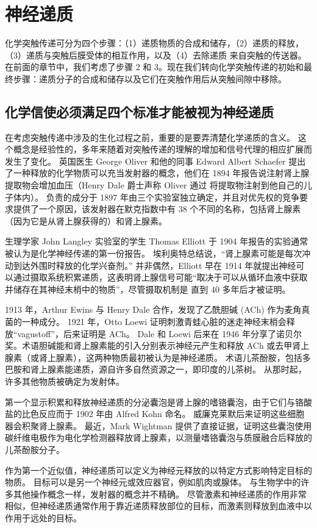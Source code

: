 \chapter{神经递质}
化学突触传递可分为四个步骤：（1）递质物质的合成和储存，（2）递质的释放，（3）递质与突触后膜受体的相互作用，以及（4）去除递质 来自突触的传送器。 在前面的章节中，我们考虑了步骤 2 和 3。现在我们转向化学突触传递的初始和最终步骤：递质分子的合成和储存以及它们在突触作用后从突触间隙中移除。

\section{化学信使必须满足四个标准才能被视为神经递质}
在考虑突触传递中涉及的生化过程之前，重要的是要弄清楚化学递质的含义。 这个概念是经验性的，多年来随着对突触传递的理解的增加和信号代理的相应扩展而发生了变化。 英国医生 George Oliver 和他的同事 Edward Albert Schaefer 提出了一种释放的化学物质可以充当发射器的概念，他们在 1894 年报告说注射肾上腺提取物会增加血压（Henry Dale 爵士声称 Oliver 通过 将提取物注射到他自己的儿子体内）。 负责的成分于 1897 年由三个实验室独立确定，并且对优先权的竞争要求提供了一个原因，该发射器在默克指数中有 38 个不同的名称，包括肾上腺素（因为它是从肾上腺获得的）和肾上腺素。

生理学家 John Langley 实验室的学生 Thomas Elliott 于 1904 年报告的实验通常被认为是化学神经传递的第一份报告。 埃利奥特总结说，“肾上腺素可能是每次冲动到达外围时释放的化学兴奋剂。” 并非偶然，Elliott 早在 1914 年就提出神经可以通过摄取系统积累递质，这表明肾上腺信号可能“取决于可以从循环血液中获取并储存在其神经末梢中的物质”，尽管摄取机制是 直到 40 多年后才被证明。

1913 年，Arthur Ewins 与 Henry Dale 合作，发现了乙酰胆碱 (ACh) 作为麦角真菌的一种成分。 1921 年，Otto Loewi 证明刺激青蛙心脏的迷走神经末梢会释放“vagustoff”，后来证明是 ACh。 Dale 和 Loewi 后来在 1946 年分享了诺贝尔奖。术语胆碱能和肾上腺素能的引入分别表示神经元产生和释放 ACh 或去甲肾上腺素（或肾上腺素），这两种物质最初被认为是神经递质。 术语儿茶酚胺，包括多巴胺和肾上腺素能递质，源自许多自然资源之一，即印度的儿茶树。 从那时起，许多其他物质被确定为发射体。

第一个显示积累和释放神经递质的分泌囊泡是肾上腺的嗜铬囊泡，由于它们与铬酸盐的比色反应而于 1902 年由 Alfred Kohn 命名。 威廉克莱默后来证明这些细胞器会积聚肾上腺素。 最近，Mark Wightman 提供了直接证据，证明这些囊泡使用碳纤维电极作为电化学检测器释放肾上腺素，以测量嗜铬囊泡与质膜融合后释放的儿茶酚胺分子。

作为第一个近似值，神经递质可以定义为神经元释放的以特定方式影响特定目标的物质。 目标可以是另一个神经元或效应器官，例如肌肉或腺体。 与生物学中的许多其他操作概念一样，发射器的概念并不精确。 尽管激素和神经递质的作用非常相似，但神经递质通常作用于靠近递质释放部位的目标，而激素则释放到血液中以作用于远处的目标。

